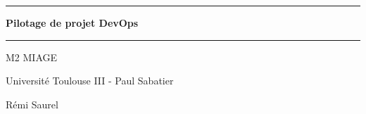 \begin{figure}
    \vspace{3cm}
\end{figure}

\begin{titlepage}
    \begin{center}
        \noindent\rule{\textwidth}{0,5pt}

        \vspace{1cm}

        \huge
        \textbf{Pilotage de projet DevOps}
        \vspace{0,7cm}

        \noindent\rule{\textwidth}{0,5pt}

        \vspace{2cm}

        \Large
        M2 MIAGE
        \vspace{1cm}

        Université Toulouse III - Paul Sabatier

        \vspace{8cm}

        \Large
        Rémi Saurel

        \vspace{1cm}
    \end{center}
\end{titlepage}

\thispagestyle{empty}
\newpage